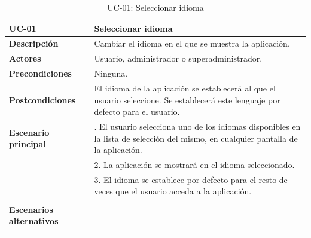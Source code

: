 \begin{table}[H]
  \begin{center}
    \begin{tabularx}{16.4cm}{|l|X|}
      \hline
      \textbf{UC-01} & \textbf{Seleccionar idioma}\\
      \hline
      \textbf{Descripción} & Cambiar el idioma en el que se muestra la aplicación.\\
      \hline
      \textbf{Actores} & Usuario, administrador o superadministrador.\\
      \hline
      \textbf{Precondiciones} & Ninguna.\\
      \hline
      \textbf{Postcondiciones} & El idioma de la aplicación se establecerá al que el usuario seleccione. Se establecerá este lenguaje por defecto para el usuario.\\
      \hline
      \textbf{Escenario principal} & \smallskip 1. El usuario selecciona uno de los idiomas disponibles en la lista de selección del mismo, en cualquier pantalla de la aplicación.\\
      & 2. La aplicación se mostrará en el idioma seleccionado.\\
      & 3. El idioma se establece por defecto para el resto de veces que el usuario acceda a la aplicación.\\
      & \\
      \hline
      \textbf{Escenarios alternativos} & \\
      & \\
      \hline
    \end{tabularx}
    \caption{UC-01: Seleccionar idioma}
    \label{tab:CU-idioma}
  \end{center}
\end{table}


